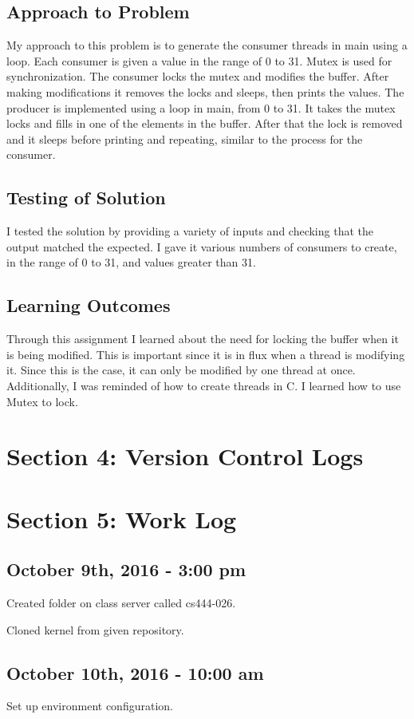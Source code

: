 \documentclass[letterpaper,10pt]{article}
\begin{document}
\subsection{Approach to Problem}
My approach to this problem is to generate the consumer threads in main using a
loop. Each consumer is given a value in the range of 0 to 31. Mutex is used for
synchronization. The consumer locks the mutex and modifies the buffer. After
making modifications it removes the locks and sleeps, then prints the values.
The producer is implemented using a loop in main, from 0 to 31. It takes the
mutex locks and fills in one of the elements in the buffer. After that the lock
is removed and it sleeps before printing and repeating, similar to the process
for the consumer.
\subsection{Testing of Solution}
I tested the solution by providing a variety of inputs and checking that the
output matched the expected. I gave it various numbers of consumers to create,
in the range of 0 to 31, and values greater than 31.
\subsection{Learning Outcomes}
Through this assignment I learned about the need for locking the buffer when it
is being modified. This is important since it is in flux when a thread is
modifying it. Since this is the case, it can only be modified by one thread at
once. Additionally, I was reminded of how to create threads in C. I learned how
to use Mutex to lock.

\section{Section 4: Version Control Logs}


\section{Section 5: Work Log}
\subsection{October 9th, 2016 - 3:00 pm}
Created folder on class server called cs444-026.

Cloned kernel from given repository.
\subsection{October 10th, 2016 - 10:00 am}
Set up environment configuration.
\end{document}
